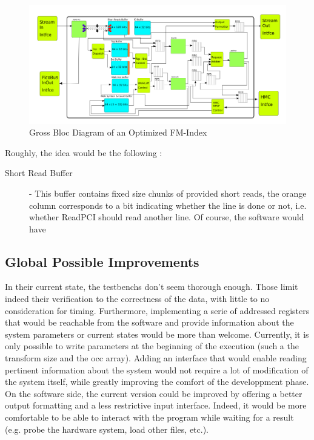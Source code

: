 \begin{figure}[H]
    \centering
    \includegraphics [scale = 0.5]{Figures/FM_OPTI.png}
    \caption{Gross Bloc Diagram of an Optimized FM-Index}
    \label{fig:FM_FIFO}
\end{figure}

Roughly, the idea would be the following :
\begin{description}
    \item [Short Read Buffer] - This buffer contains fixed size chunks of provided short reads, the orange column corresponds to a bit indicating whether the line is done or not, i.e. whether ReadPCI should read another line. Of course, the software would have 
\end{description}

\subsection{Global Possible Improvements}

In their current state, the testbenchs don't seem thorough enough. Those limit indeed their verification to the correctness of the data, with little to no consideration for timing. Furthermore, implementing a serie of addressed registers that would be reachable from the software and provide information about the system parameters or current states would be more than welcome. Currently, it is only possible to write parameters at the beginning of the execution (such a the transform size and the occ array). Adding an interface that would enable reading pertinent information about the system would not require a lot of modification of the system itself, while greatly improving the comfort of the developpment phase. \\


On the software side, the current version could be improved by offering a better output formatting and a less restrictive input interface. Indeed, it would be more comfortable to be able to interact with the program while waiting for a result (e.g. probe the hardware system, load other files, etc.).


